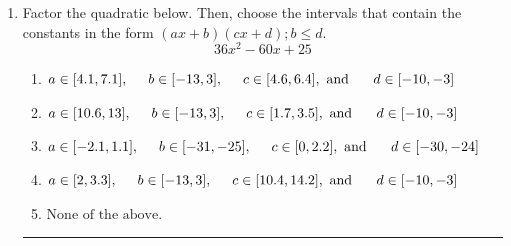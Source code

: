 \documentclass[14pt]{extbook}
\newcommand{\litem}[1]{\item#1\hspace*{-1cm}\rule{\textwidth}{0.4pt}}
\begin{document}
\begin{enumerate}
{\begin{enumerate}[label=\Alph*.]
\end{enumerate} }
\litem{
Factor the quadratic below. Then, choose the intervals that contain the constants in the form $(ax+b)(cx+d); b \leq d.$\[ 36x^{2} -60 x + 25 \]\begin{enumerate}[label=\Alph*.]
\item \( a \in [4.1, 7.1], \hspace*{5mm} b \in [-13, 3], \hspace*{5mm} c \in [4.6, 6.4], \text{ and } \hspace*{5mm} d \in [-10, -3] \)
\item \( a \in [10.6, 13], \hspace*{5mm} b \in [-13, 3], \hspace*{5mm} c \in [1.7, 3.5], \text{ and } \hspace*{5mm} d \in [-10, -3] \)
\item \( a \in [-2.1, 1.1], \hspace*{5mm} b \in [-31, -25], \hspace*{5mm} c \in [0, 2.2], \text{ and } \hspace*{5mm} d \in [-30, -24] \)
\item \( a \in [2, 3.3], \hspace*{5mm} b \in [-13, 3], \hspace*{5mm} c \in [10.4, 14.2], \text{ and } \hspace*{5mm} d \in [-10, -3] \)
\item \( \text{None of the above.} \)


\end{enumerate}}
\end{enumerate}
\end{document}
